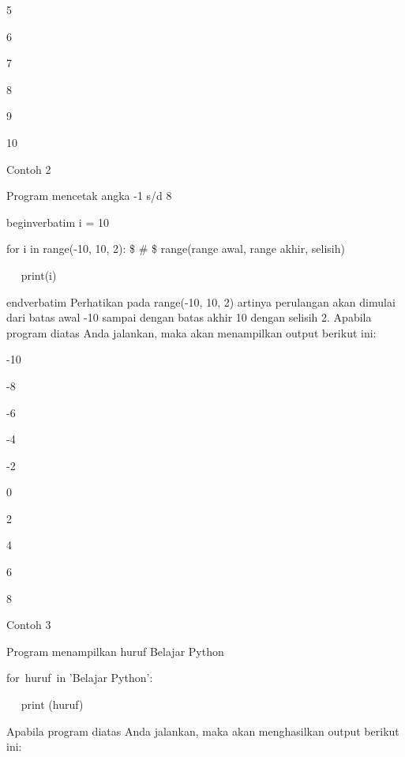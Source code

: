 5 \par
6 \par
7 \par
8 \par
9 \par
10 \par
\vspace{\baselineskip}
Contoh 2\vspace{\baselineskip}
\vspace{\baselineskip}
 \par
 Program mencetak angka -1 s/d 8 \par
\vspace{12pt}
begin{verbatim}
i = 10 \par
for i in range(-10, 10, 2):  \$  \#  \$ range(range awal, range akhir, selisih) \par
~~ print(i) \par
end{verbatim}
\vspace{12pt}
\vspace{\baselineskip}
Perhatikan pada range(-10, 10, 2) artinya perulangan akan dimulai dari batas awal -10 sampai dengan batas akhir 10 dengan selisih 2.\vspace{\baselineskip}
\vspace{\baselineskip}
Apabila program diatas Anda jalankan, maka akan menampilkan output berikut ini:\vspace{\baselineskip}
\vspace{\baselineskip}
 \par
-10 \par
-8 \par
-6 \par
-4 \par
-2 \par
0 \par
2 \par
4 \par
6 \par
8 \par
\vspace{\baselineskip}
Contoh 3\vspace{\baselineskip}
\vspace{\baselineskip}
 \par
Program menampilkan huruf Belajar Python \par
for~huruf~in 'Belajar Python':    \par
~~ print (huruf) \par
\vspace{\baselineskip}
Apabila program diatas Anda jalankan, maka akan menghasilkan output berikut ini:\vspace{\baselineskip}
